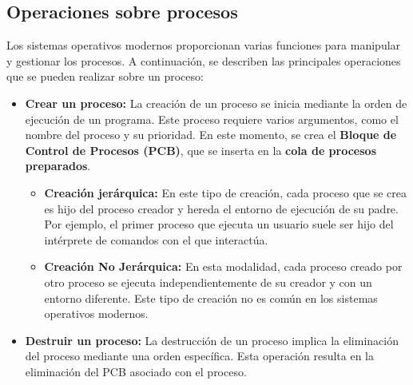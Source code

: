 \subsection{Operaciones sobre procesos}

Los sistemas operativos modernos proporcionan varias funciones para manipular y gestionar los procesos. A continuación, se describen las principales operaciones que se pueden realizar sobre un proceso:


\begin{tcolorbox}

\begin{itemize}
	\item \textbf{Crear un proceso:}
	La creación de un proceso se inicia mediante la orden de ejecución de un programa. Este proceso requiere varios argumentos, como el nombre del proceso y su prioridad. En este momento, se crea el \textbf{Bloque de Control de Procesos (PCB)}, que se inserta en la \textbf{cola de procesos preparados}.
	
	\begin{itemize}
		\item \textbf{Creación jerárquica:} En este tipo de creación, cada proceso que se crea es hijo del proceso creador y hereda el entorno de ejecución de su padre. Por ejemplo, el primer proceso que ejecuta un usuario suele ser hijo del intérprete de comandos con el que interactúa.
		\item \textbf{Creación No Jerárquica:} En esta modalidad, cada proceso creado por otro proceso se ejecuta independientemente de su creador y con un entorno diferente. Este tipo de creación no es común en los sistemas operativos modernos.
	\end{itemize}
	
	\item \textbf{Destruir un proceso:}
	La destrucción de un proceso implica la eliminación del proceso mediante una orden específica. Esta operación resulta en la eliminación del PCB asociado con el proceso.
	

	
	\end{itemize}
	
	\end{tcolorbox}
	
